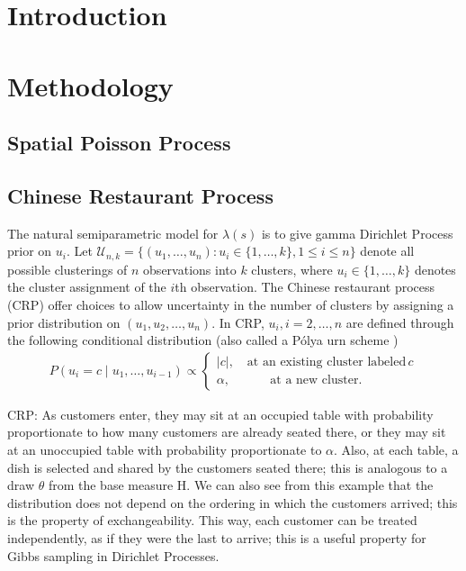 \documentclass[12pt]{article}
\newcommand{\abs}[1]{\left\vert#1\right\vert}
\def\m{\mathcal}
\begin{document}
\maketitle
\begin{abstract}

\end{abstract}

\section{Introduction}\label{sec:intro}
\section{Methodology}\label{sec:method}
\subsection{Spatial Poisson Process}
\subsection{Chinese Restaurant Process }
The natural semiparametric model for $\lambda(s)$ is to give gamma
Dirichlet Process prior on $u_i$. Let
$\m U_{n, k} = \big\{(u_1, \ldots, u_n) : u_i \in \{1, \ldots, k\}, 1 \le i \le n \big\}$
denote all possible clusterings of $n$ observations into $k$ clusters,
where $u_i \in \{1, \ldots, k\}$ denotes the cluster assignment of the
$i$th observation. The Chinese restaurant process
(CRP)\citep{pitman1995exchangeable, neal2000markov} offer choices to
allow uncertainty in the number of clusters by assigning a prior
distribution on $(u_1, u_2, \ldots, u_n)$. In CRP, $u_i, i=2, \ldots,
n$ are defined through the following conditional distribution  (also
called a P\'{o}lya urn scheme \cite{blackwell1973ferguson})
\begin{eqnarray}\label{eq:crp}
  P(u_{i} = c \mid u_{1}, \ldots, u_{i-1})  \propto
  \begin{cases}
    \abs{c}  , \quad  \text{at an existing cluster labeled}\, c\\
    \alpha,  \quad \quad \quad \, \text{at a new cluster}.
  \end{cases}
\end{eqnarray}

CRP: As customers enter, they may sit at an occupied table with
probability proportionate to how many customers are already seated
there, or they may sit at an unoccupied table with probability
proportionate to $\alpha$. Also, at each table, a dish is selected and
shared by the customers seated there; this is analogous to a draw
$\theta$ from the base measure H. We can also see from this example
that the distribution does not depend on the ordering in which the
customers arrived; this is the property of exchangeability. This way,
each customer can be treated independently, as if they were the last
to arrive; this is a useful property for Gibbs sampling in Dirichlet
Processes.
\end{document}
